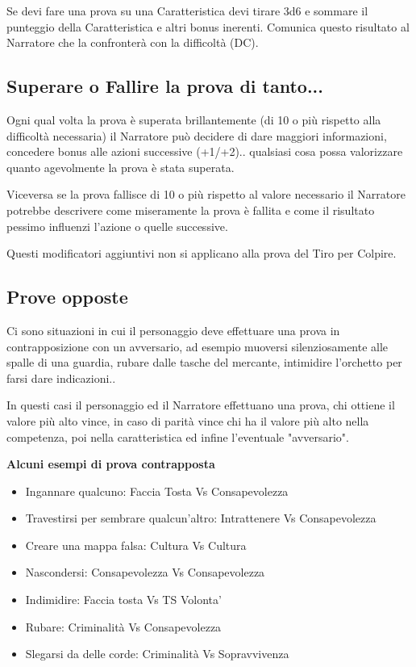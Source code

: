 \documentclass[a4paper,11pt,twoside,openany]{book}
\begin{document}
\bigskip

Se devi fare una prova su una Caratteristica devi tirare 3d6 e sommare il punteggio della Caratteristica e altri bonus inerenti. Comunica questo risultato al Narratore che la confronterà con la difficoltà (DC).

\subsection{Superare o Fallire la prova di tanto...}

Ogni qual volta la prova è superata brillantemente (di 10 o più rispetto alla difficoltà necessaria) il Narratore può decidere di dare maggiori informazioni, concedere bonus alle azioni successive (+1/+2).. qualsiasi cosa possa valorizzare quanto agevolmente la prova è stata superata.

Viceversa se la prova fallisce di 10 o più rispetto al valore necessario il Narratore potrebbe descrivere come miseramente la prova è fallita e come il risultato pessimo influenzi l'azione o quelle successive.

Questi modificatori aggiuntivi non si applicano alla prova del Tiro per Colpire.

\subsection{Prove opposte}

Ci sono situazioni in cui il personaggio deve effettuare una prova in contrapposizione con un avversario, ad esempio muoversi silenziosamente alle spalle di una guardia, rubare dalle tasche del mercante, intimidire l'orchetto per farsi dare indicazioni..

In questi casi il personaggio ed il Narratore effettuano una prova, chi ottiene il valore più alto vince, in caso di parità vince chi ha il valore più alto nella competenza, poi nella caratteristica ed infine l'eventuale "avversario".

\bigskip

\textbf{Alcuni esempi di prova contrapposta}

\begin{itemize}
	\item Ingannare qualcuno: Faccia Tosta Vs Consapevolezza
	\item Travestirsi per sembrare qualcun'altro: Intrattenere Vs Consapevolezza
	\item Creare una mappa falsa: Cultura Vs Cultura
	\item Nascondersi: Consapevolezza Vs Consapevolezza
	\item Indimidire: Faccia tosta Vs TS Volonta'
	\item Rubare: Criminalità Vs Consapevolezza
	\item Slegarsi da delle corde: Criminalità Vs Sopravvivenza
\end{itemize}
\end{document}
